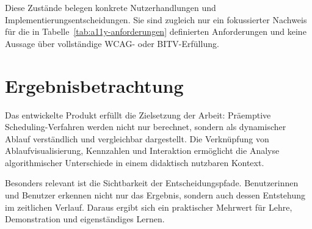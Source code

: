 Diese Zustände belegen konkrete Nutzerhandlungen und Implementierungsentscheidungen. Sie sind zugleich nur ein fokussierter Nachweis für die in Tabelle~\ref{tab:a11y-anforderungen} definierten Anforderungen und keine Aussage über vollständige WCAG- oder BITV-Erfüllung.

\section{Ergebnisbetrachtung}

Das entwickelte Produkt erfüllt die Zielsetzung der Arbeit: Präemptive Scheduling-Verfahren werden nicht nur berechnet, sondern als dynamischer Ablauf verständlich und vergleichbar dargestellt. Die Verknüpfung von Ablaufvisualisierung, Kennzahlen und Interaktion ermöglicht die Analyse algorithmischer Unterschiede in einem didaktisch nutzbaren Kontext.

Besonders relevant ist die Sichtbarkeit der Entscheidungspfade. Benutzerinnen und Benutzer erkennen nicht nur das Ergebnis, sondern auch dessen Entstehung im zeitlichen Verlauf. Daraus ergibt sich ein praktischer Mehrwert für Lehre, Demonstration und eigenständiges Lernen.

